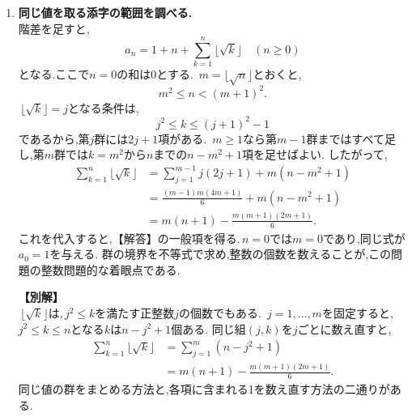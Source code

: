     \noindent {}
    \begin{enumerate}[label=(\arabic*),parsep=3pt,format=\bookitemlink{example-gauss-integer-draft}{solution}{problem}]
      \item \textbf{同じ値を取る添字の範囲を調べる.}\\
            階差を足すと,
            \[
              a_n=1+n+\sum_{k=1}^{n}\lfloor\sqrt k\rfloor
              \quad(n\ge0)
            \]
            となる.ここで$n=0$の和は0とする.
            \,$m=\lfloor\sqrt n\rfloor$とおくと,
            \[
              m^2\le n<(m+1)^2.
            \]
            \,$\lfloor\sqrt k\rfloor=j$となる条件は,
            \[
              j^2\le k\le(j+1)^2-1
            \]
            であるから,第$j$群には$2j+1$項がある.
            \,$m\ge1$なら第$m-1$群まではすべて足し,第$m$群では$k=m^2$から$n$までの$n-m^2+1$項を足せばよい.
            したがって,
            \begin{align*}
              \sum_{k=1}^{n}\lfloor\sqrt k\rfloor
                &=\sum_{j=1}^{m-1}j(2j+1)+m(n-m^2+1)\\
                &=\frac{(m-1)m(4m+1)}6+m(n-m^2+1)\\
                &=m(n+1)-\frac{m(m+1)(2m+1)}6.
            \end{align*}
            これを代入すると,【解答】の一般項を得る.\,$n=0$では$m=0$であり,同じ式が$a_0=1$を与える.
            群の境界を不等式で求め,整数の個数を数えることが,この問題の整数問題的な着眼点である.

            \noindent \textbf{【別解】}\\
            \,$\lfloor\sqrt k\rfloor$は,\,$j^2\le k$を満たす正整数$j$の個数でもある.
            \,$j=1,\ldots,m$を固定すると,\,$j^2\le k\le n$となる$k$は$n-j^2+1$個ある.
            同じ組$(j,k)$を$j$ごとに数え直すと,
            \begin{align*}
              \sum_{k=1}^{n}\lfloor\sqrt k\rfloor
                &=\sum_{j=1}^{m}(n-j^2+1)\\
                &=m(n+1)-\frac{m(m+1)(2m+1)}6.
            \end{align*}
            同じ値の群をまとめる方法と,各項に含まれる1を数え直す方法の二通りがある.


\end{enumerate}
